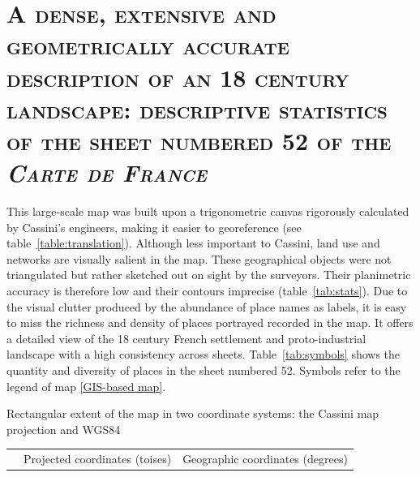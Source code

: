 \documentclass[portrait,a0]{sciposter}
\begin{document}
\vspace{-1cm}
\begin{minipage}[b]{\textwidth}
  \section{\normalfont \textsc{A dense, extensive and geometrically accurate description of an 18 century landscape: descriptive statistics of the sheet numbered 52 of the \textit{Carte de France}}}
  
  \small{%
  This large-scale map was built upon a trigonometric canvas rigorously calculated by Cassini's engineers, making it easier to georeference (see table~\ref{table:translation}). Although less important to Cassini, land use and networks are visually salient in the map. These geographical objects were not triangulated but rather sketched out on sight by the surveyors. Their planimetric accuracy is therefore low and their contours imprecise (table~\ref{tab:stats}). Due to the visual clutter produced by the abundance of place names as labels, it is easy to miss the richness and density of places portrayed recorded in the map. It offers a detailed view of the 18 century French settlement and proto-industrial landscape with a high consistency across sheets. Table~\ref{tab:symbols} shows the quantity and diversity of places in the sheet numbered 52. Symbols refer to the legend of map \ref{GIS-based map}.}
  \vspace{-0.8cm}
  \begin{multicols}{3}
    \setlength{\columnsep}{80pt}
    \footnotesize
    \begin{center}
      \captionsetup{type=table}
      \caption{Rectangular extent of the map in two coordinate systems: the Cassini map projection and WGS84}
      \label{table:translation}
      \begin{tabular}{@{}lcccc@{}}
        \toprule
        & \multicolumn{2}{c}{Projected coordinates (toises)}                                                & \multicolumn{2}{c}{Geographic coordinates (degrees)}              \\

\end{tabular}
\end{center}
\end{multicols}
\end{minipage}
\end{document}
